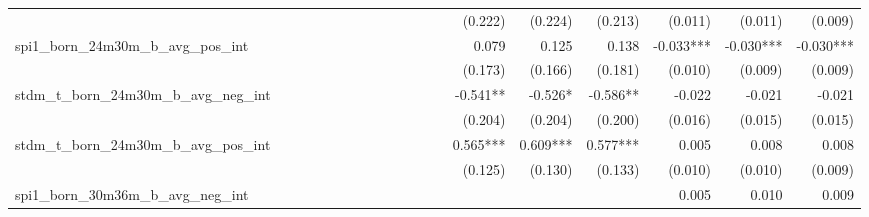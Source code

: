 \begin{tabular}{lrrrrrrrrrrrrrrrrrr}
                                            &              &              &              &              &              &              &              &              &               &              &              &               &      (0.222) &      (0.224) &       (0.213) &      (0.011) &      (0.011) &       (0.009) \\ 
spi1\_born\_24m30m\_b\_avg\_pos\_int        &              &              &              &              &              &              &              &              &               &              &              &               &        0.079 &        0.125 &         0.138 &    -0.033*** &    -0.030*** &     -0.030*** \\ 
                                            &              &              &              &              &              &              &              &              &               &              &              &               &      (0.173) &      (0.166) &       (0.181) &      (0.010) &      (0.009) &       (0.009) \\ 
stdm\_t\_born\_24m30m\_b\_avg\_neg\_int     &              &              &              &              &              &              &              &              &               &              &              &               &     -0.541** &      -0.526* &      -0.586** &       -0.022 &       -0.021 &        -0.021 \\ 
                                            &              &              &              &              &              &              &              &              &               &              &              &               &      (0.204) &      (0.204) &       (0.200) &      (0.016) &      (0.015) &       (0.015) \\ 
stdm\_t\_born\_24m30m\_b\_avg\_pos\_int     &              &              &              &              &              &              &              &              &               &              &              &               &     0.565*** &     0.609*** &      0.577*** &        0.005 &        0.008 &         0.008 \\ 
                                            &              &              &              &              &              &              &              &              &               &              &              &               &      (0.125) &      (0.130) &       (0.133) &      (0.010) &      (0.010) &       (0.009) \\ 
spi1\_born\_30m36m\_b\_avg\_neg\_int        &              &              &              &              &              &              &              &              &               &              &              &               &              &              &               &        0.005 &        0.010 &         0.009 \\ 

\end{tabular}
